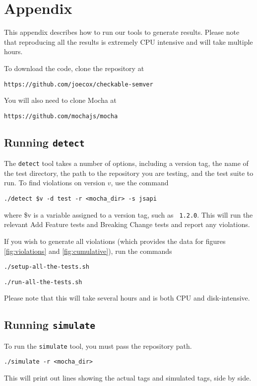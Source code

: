 \section{Appendix}
This appendix describes how to run our tools to generate
results. Please note that reproducing all the results is extremely
CPU intensive and will take multiple hours.

To download the code, clone the repository at
\begin{center}
  {\tt https://github.com/joecox/checkable-semver}
\end{center}

You will also need to clone Mocha at
\begin{center}
  {\tt https://github.com/mochajs/mocha}
\end{center}

\subsection{Running {\large {\tt detect}}}

The {\tt detect} tool takes a number of options, including a version
tag, the name of the test directory, the path to the repository you
are testing, and the test suite to run. To find violations on version
$v$, use the command

\begin{center}
  {\tt ./detect \$v -d test -r <mocha\_dir> -s jsapi}
\end{center}
where \$v is a variable assigned to a version tag, such as {\tt
  1.2.0}. This will run the relevant Add Feature tests and Breaking
Change tests and report any violations.

If you wish to generate all violations (which provides the data for
figures \ref{fig:violations} and \ref{fig:cumulative}), run the
commands

\begin{center}
  {\tt ./setup-all-the-tests.sh}
\end{center}
\begin{center}
  {\tt ./run-all-the-tests.sh}
\end{center}
Please note that this will take several hours and is both CPU and
disk-intensive.

\subsection{Running {\large {\tt simulate}}}

To run the {\tt simulate} tool, you must pass the repository path.

\begin{center}
  {\tt ./simulate -r <mocha\_dir>}
\end{center}
This will print out lines showing the actual tags and simulated tags,
side by side.

